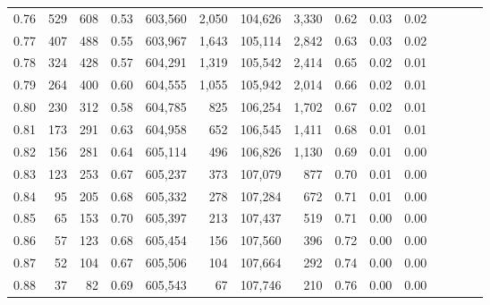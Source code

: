 \begin{tabular}{rrrcrrrrrrrrrrr}
0.76 &     529 &    608 &                                       0.53 &  603,560 &    2,050 &  104,626 &    3,330 &  0.62 &  0.03 &                         0.02 \\
0.77 &     407 &    488 &                                       0.55 &  603,967 &    1,643 &  105,114 &    2,842 &  0.63 &  0.03 &                         0.02 \\
0.78 &     324 &    428 &                                       0.57 &  604,291 &    1,319 &  105,542 &    2,414 &  0.65 &  0.02 &                         0.01 \\
0.79 &     264 &    400 &                                       0.60 &  604,555 &    1,055 &  105,942 &    2,014 &  0.66 &  0.02 &                         0.01 \\
0.80 &     230 &    312 &                                       0.58 &  604,785 &      825 &  106,254 &    1,702 &  0.67 &  0.02 &                         0.01 \\
0.81 &     173 &    291 &                                       0.63 &  604,958 &      652 &  106,545 &    1,411 &  0.68 &  0.01 &                         0.01 \\
0.82 &     156 &    281 &                                       0.64 &  605,114 &      496 &  106,826 &    1,130 &  0.69 &  0.01 &                         0.00 \\
0.83 &     123 &    253 &                                       0.67 &  605,237 &      373 &  107,079 &      877 &  0.70 &  0.01 &                         0.00 \\
0.84 &      95 &    205 &                                       0.68 &  605,332 &      278 &  107,284 &      672 &  0.71 &  0.01 &                         0.00 \\
0.85 &      65 &    153 &                                       0.70 &  605,397 &      213 &  107,437 &      519 &  0.71 &  0.00 &                         0.00 \\
0.86 &      57 &    123 &                                       0.68 &  605,454 &      156 &  107,560 &      396 &  0.72 &  0.00 &                         0.00 \\
0.87 &      52 &    104 &                                       0.67 &  605,506 &      104 &  107,664 &      292 &  0.74 &  0.00 &                         0.00 \\
0.88 &      37 &     82 &                                       0.69 &  605,543 &       67 &  107,746 &      210 &  0.76 &  0.00 &                         0.00 \\

\end{tabular}
